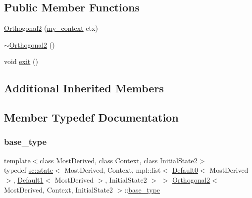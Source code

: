 \subsection*{Public Member Functions}
\begin{DoxyCompactItemize}
\item 
\mbox{\hyperlink{struct_orthogonal2_ac814af29c27f7c0c38e7efd56c0926fa}{Orthogonal2}} (\mbox{\hyperlink{struct_orthogonal2_a7ba3bc806df60eb29290185043ac202e}{my\+\_\+context}} ctx)
\item 
\mbox{\hyperlink{struct_orthogonal2_af68941e005d69423e7d1b4e142d247ed}{$\sim$\+Orthogonal2}} ()
\item 
void \mbox{\hyperlink{struct_orthogonal2_a0c721d40bb642f3c7506ca095661ee3d}{exit}} ()
\end{DoxyCompactItemize}
\subsection*{Additional Inherited Members}


\subsection{Member Typedef Documentation}
\mbox{\label{struct_orthogonal2_ae34a8b5ceae188cb0020b4f396f9fee0}} 
\subsubsection{\texorpdfstring{base\+\_\+type}{base\_type}}
{\footnotesize\ttfamily template$<$class Most\+Derived, class Context, class Initial\+State2$>$ \\
typedef \mbox{\hyperlink{classboost_1_1statechart_1_1state}{sc\+::state}}$<$ Most\+Derived, Context, mpl\+::list$<$ \mbox{\hyperlink{struct_default0}{Default0}}$<$ Most\+Derived $>$, \mbox{\hyperlink{struct_default1}{Default1}}$<$ Most\+Derived $>$, Initial\+State2 $>$ $>$ \mbox{\hyperlink{struct_orthogonal2}{Orthogonal2}}$<$ Most\+Derived, Context, Initial\+State2 $>$\+::\mbox{\hyperlink{struct_orthogonal2_ae34a8b5ceae188cb0020b4f396f9fee0}{base\+\_\+type}}}

\mbox{\label{struct_orthogonal2_a358118e3ce2f0ecb8725f77bcfcc4591}} 
